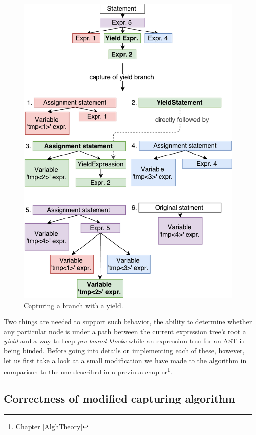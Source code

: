 \begin{figure}[h]
	\centering	
	\includegraphics[scale=0.75]{../img/5_3_branchesWithYields}	
	\caption{Capturing a branch with a yield.}
	\label{fig5.3:CaptureWithYield}
\end{figure}

Two things are needed to support such behavior, the ability to determine whether any particular node is under a path between the current expression tree’s root a \emph{yield} and a way to keep \emph{pre-bound blocks} while an expression tree for an AST is being binded. Before going into details on implementing each of these, however, let us first take a look at a small modification we have made to the algorithm in comparison to the one described in a previous chapter\footnote{Chapter \ref{AlghTheory}}.

\subsection{Correctness of modified capturing algorithm}

